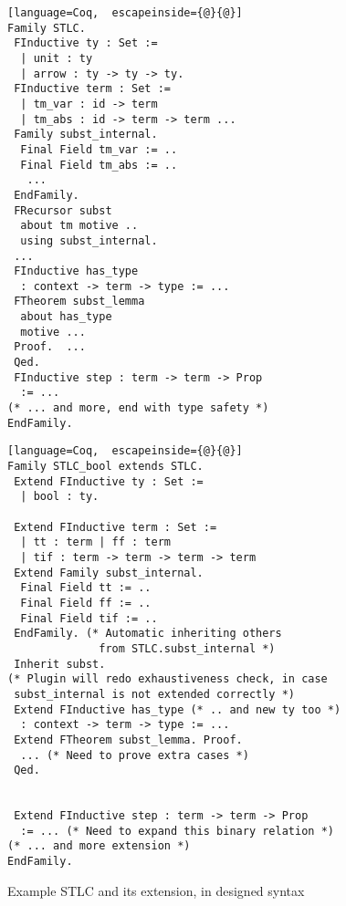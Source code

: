 \begin{figure}
\begin{minipage}{\textwidth}
\begin{multicols}{2}
\end{multicols}
\end{minipage}

\vspace{2em}

  \begin{minipage}[t]{0.47\linewidth}
\begin{lstlisting}[language=Coq,  escapeinside={@}{@}]
Family STLC.
 FInductive ty : Set :=
  | unit : ty
  | arrow : ty -> ty -> ty.
 FInductive term : Set := 
  | tm_var : id -> term 
  | tm_abs : id -> term -> term ...
 Family subst_internal.
  Final Field tm_var := ..
  Final Field tm_abs := ..
   ...
 EndFamily.
 FRecursor subst
  about tm motive ..
  using subst_internal.
 ...
 FInductive has_type 
  : context -> term -> type := ...
 FTheorem subst_lemma 
  about has_type 
  motive ...
 Proof.  ...
 Qed.
 FInductive step : term -> term -> Prop 
  := ...
(* ... and more, end with type safety *)
EndFamily.
\end{lstlisting}
  \end{minipage}
  \begin{minipage}[t]{0.47\linewidth}
\begin{lstlisting}[language=Coq,  escapeinside={@}{@}]
Family STLC_bool extends STLC.
 Extend FInductive ty : Set :=
  | bool : ty.

 Extend FInductive term : Set := 
  | tt : term | ff : term 
  | tif : term -> term -> term -> term
 Extend Family subst_internal.
  Final Field tt := ..
  Final Field ff := ..
  Final Field tif := ..
 EndFamily. (* Automatic inheriting others 
              from STLC.subst_internal *)
 Inherit subst.
(* Plugin will redo exhaustiveness check, in case 
 subst_internal is not extended correctly *)
 Extend FInductive has_type (* .. and new ty too *)
  : context -> term -> type := ...
 Extend FTheorem subst_lemma. Proof.
  ... (* Need to prove extra cases *)
 Qed.


 Extend FInductive step : term -> term -> Prop 
  := ... (* Need to expand this binary relation *)
(* ... and more extension *)
EndFamily.
\end{lstlisting}
  \end{minipage}
  \caption{Example STLC and its extension, in designed syntax}\label{fig:STLC-example2}
\end{figure}
  